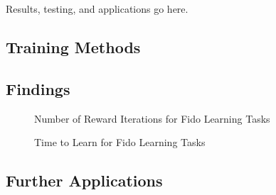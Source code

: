 Results, testing, and applications go here.
\long\def\/*#1*/{}
\subsection{Training Methods}

\subsection{Findings}

\begin{figure}[ht]
	\centering
	
	\caption{Number of Reward Iterations for Fido Learning Tasks}
\end{figure}

\begin{figure}[ht]
	\centering
	
	\caption{Time to Learn for Fido Learning Tasks}
\end{figure}

\/*
Outline
- Compare to discrete
- Compare to other action selection methods
- Compare to actor critic

*/

\subsection{Further Applications}